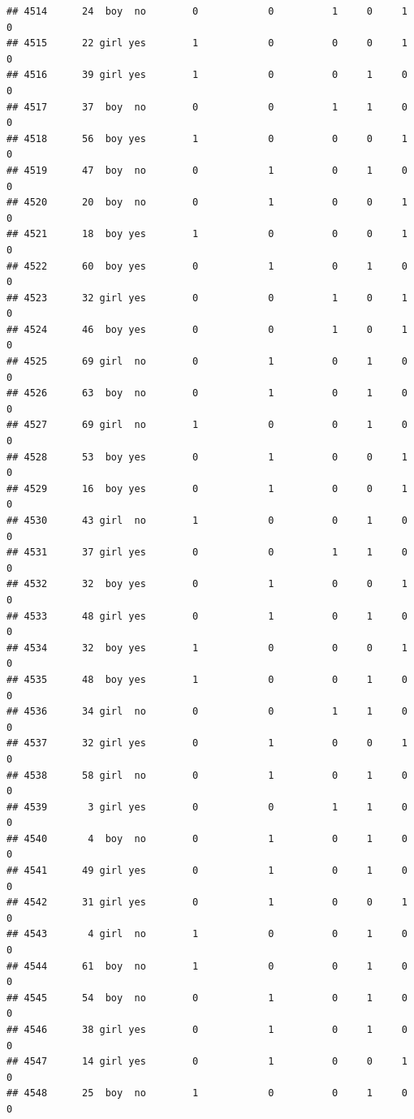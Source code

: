 \documentclass[man]{apa6}
\begin{document}
\begin{verbatim}
## 4514      24  boy  no        0            0          1     0     1     0
## 4515      22 girl yes        1            0          0     0     1     0
## 4516      39 girl yes        1            0          0     1     0     0
## 4517      37  boy  no        0            0          1     1     0     0
## 4518      56  boy yes        1            0          0     0     1     0
## 4519      47  boy  no        0            1          0     1     0     0
## 4520      20  boy  no        0            1          0     0     1     0
## 4521      18  boy yes        1            0          0     0     1     0
## 4522      60  boy yes        0            1          0     1     0     0
## 4523      32 girl yes        0            0          1     0     1     0
## 4524      46  boy yes        0            0          1     0     1     0
## 4525      69 girl  no        0            1          0     1     0     0
## 4526      63  boy  no        0            1          0     1     0     0
## 4527      69 girl  no        1            0          0     1     0     0
## 4528      53  boy yes        0            1          0     0     1     0
## 4529      16  boy yes        0            1          0     0     1     0
## 4530      43 girl  no        1            0          0     1     0     0
## 4531      37 girl yes        0            0          1     1     0     0
## 4532      32  boy yes        0            1          0     0     1     0
## 4533      48 girl yes        0            1          0     1     0     0
## 4534      32  boy yes        1            0          0     0     1     0
## 4535      48  boy yes        1            0          0     1     0     0
## 4536      34 girl  no        0            0          1     1     0     0
## 4537      32 girl yes        0            1          0     0     1     0
## 4538      58 girl  no        0            1          0     1     0     0
## 4539       3 girl yes        0            0          1     1     0     0
## 4540       4  boy  no        0            1          0     1     0     0
## 4541      49 girl yes        0            1          0     1     0     0
## 4542      31 girl yes        0            1          0     0     1     0
## 4543       4 girl  no        1            0          0     1     0     0
## 4544      61  boy  no        1            0          0     1     0     0
## 4545      54  boy  no        0            1          0     1     0     0
## 4546      38 girl yes        0            1          0     1     0     0
## 4547      14 girl yes        0            1          0     0     1     0
## 4548      25  boy  no        1            0          0     1     0     0

\end{verbatim}
\end{document}

